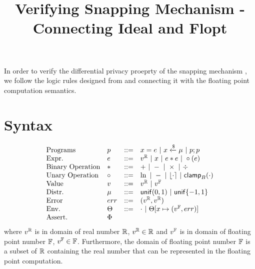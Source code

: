 \documentclass[a4paper,11pt]{article}
\begin{document}
\title{Verifying Snapping Mechanism - Connecting Ideal and Flopt}
\author{}

\date{}

\maketitle
In order to verify the differential privacy proeprty of
the snapping mechanism \cite{mironov2012significance},
we follow the logic rules designed from
\cite{barthe2016proving} and connecting 
it with the floating point computation semantics.
\section{Syntax}
\[\begin{array}{llll}
\mbox{Programs} & \prog & ::= & 
     \varx = \expr ~|~ \varx \samplel \edistr
	~|~ \prog ; \prog \\

\mbox{Expr.} & \expr & ::= & \rval 
	~|~ \varx  ~|~ \expr \bop \expr
	~|~ \uop (\expr) \\
%
\mbox{Binary Operation} & \bop & ::= & + ~|~ - ~|~ \times ~|~ \div \\
%
\mbox{Unary Operation} & \uop & ::= & \ln ~|~ - ~|~ \round{\cdot} 
	~|~ \clamp_B(\cdot) \\
%
\mbox{Value} & \valv & ::= & \rval ~|~  \fval \\
%
\mbox{Distr.} & \edistr & ::= & \uniform(0, 1) 
%
	~|~ \uniform\{-1, 1\}\\ 
%
\mbox{Error} & \err & ::= & (\rval, \rval) \\
%
\mbox{Env.} & \trsenv & ::= & \cdot ~|~ \trsenv[x \mapsto (\fval, \err)] \\
%
\mbox{Assert.} & \Phi &  & 
\end{array}
\]
where $v^{\mathbb{R}}$ is in domain of real number $\mathbb{R}$, $v^{\mathbb{R}} \in \mathbb{R}$ and $v^{\mathbb{F}}$ is in domain of floating point number $\mathbb{F}$, $v^{\mathbb{F}} \in \mathbb{F}$. Furthermore, the domain of floating point number $\mathbb{F}$ is a subset of $\mathbb{R}$ containing the real number that can be represented in the floating point computation.
\end{document}
